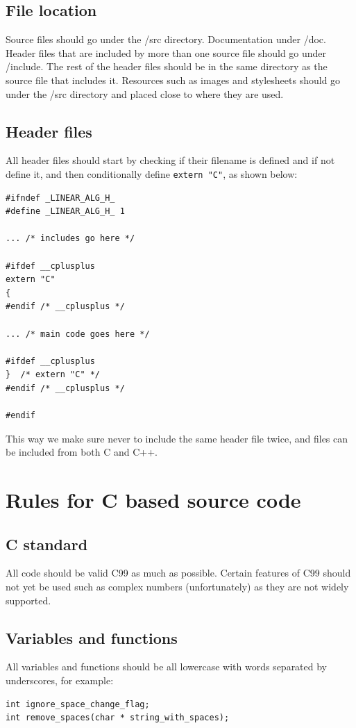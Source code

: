 \documentclass[12pt]{article}
\newenvironment{sourcestyle}{}{}%
\begin{document}
\subsection{File location}
Source files should go under the /src directory. Documentation under /doc. 
Header files that are included by more than one source file should go under /include. 
The rest of the header files should be in the same directory as the source file that includes it.
Resources such as images and stylesheets should go under the /src directory and placed close to where they are used.

\subsection{Header files}
All header files should start by checking if their filename is defined
and if not define it, and then conditionally define {\tt extern "C"},  as shown below:
\begin{sourcestyle}
\begin{verbatim}
#ifndef _LINEAR_ALG_H_
#define _LINEAR_ALG_H_ 1

... /* includes go here */

#ifdef __cplusplus
extern "C"
{
#endif /* __cplusplus */

... /* main code goes here */

#ifdef __cplusplus
}  /* extern "C" */
#endif /* __cplusplus */

#endif
\end{verbatim}
\end{sourcestyle}
This way we make sure never to include the same header file twice, and files can be included
from both C and C++.

\section{Rules for C based source code}
\subsection{C standard}
All code should be valid C99 as much as possible. Certain features of C99 should not yet 
be used such as complex numbers (unfortunately) as they are not widely supported.

\subsection{Variables and functions}
All variables and functions should be all lowercase with words separated by underscores, 
for example:
\begin{sourcestyle}
\begin{verbatim}
int ignore_space_change_flag;
int remove_spaces(char * string_with_spaces);
\end{verbatim}
\end{sourcestyle}
\end{document}
